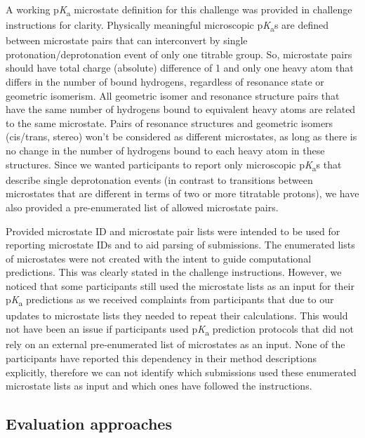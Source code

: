 \documentclass[9pt,lineno,final]{elife}
\newcommand{\pKa}{p\textit{K}\textsubscript{a}}
\begin{document}
A working \pKa{} microstate definition for this challenge was provided in challenge instructions for clarity. 
Physically meaningful microscopic \pKa{}s are defined between microstate pairs that can interconvert by single protonation/deprotonation event of only one titrable group. 
So, microstate pairs should have total charge (absolute) difference of 1 and only one heavy atom that differs in the number of bound hydrogens, regardless of resonance state or geometric isomerism. 
All geometric isomer and resonance structure pairs that have the same number of hydrogens bound to equivalent heavy atoms are related to the same microstate. 
Pairs of resonance structures and geometric isomers (cis/trans, stereo) won't be considered as different microstates, as long as there is no change in the number of hydrogens bound to each heavy atom in these structures.
Since we wanted participants to report only microscopic \pKa{}s that describe single deprotonation events (in contrast to transitions between microstates that are different in terms of two or more titratable protons), we have also provided a pre-enumerated list of allowed microstate pairs.

Provided microstate ID and microstate pair lists were intended to be used for reporting microstate IDs and to aid parsing of submissions. 
The enumerated lists of microstates were not created with the intent to guide computational predictions. 
This was clearly stated in the challenge instructions. 
However, we noticed that some participants still used the microstate lists as an input for their \pKa{} predictions as we received complaints from participants that due to our updates to microstate lists they needed to repeat their calculations. 
This would not have been an issue if participants used \pKa{} prediction protocols that did not rely on an external pre-enumerated list of microstates as an input.
None of the participants have reported this dependency in their method descriptions explicitly, therefore we can not identify which submissions used these enumerated microstate lists as input and which ones have followed the instructions.





\subsection{Evaluation approaches}
\end{document}
